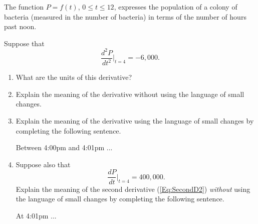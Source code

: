 \documentclass{ximera}
\begin{document}
\begin{question} \label{Q9dfgnmnmcxcv}
The function $P=f(t)$, $0\leq t \leq 12$, expresses the population of a colony of bacteria (measured in the number of bacteria) in terms of the number of hours past noon.

Suppose that
\begin{equation}
   \frac{d^2 P}{dt^2} \Big|_{t=4} =  -6,000 .  \label{Eq:SecondD2}
\end{equation}


\begin{enumerate}
\item What are the units of this derivative?

\item Explain the meaning of the derivative without using the language of small changes.

\item Explain the meaning of the derivative using the language of small changes by completing the following sentence.

Between 4:00pm and 4:01pm  ...

\item Suppose also that
\[
   \frac{dP}{dt}\Big|_{t=4} = 400,000 .
\]
Explain the meaning of the second derivative (\ref{Eq:SecondD2}) \emph{without} using the language of small changes by completing the following sentence.

At 4:01pm  ...

\end{enumerate}
\end{question}
\end{document}
